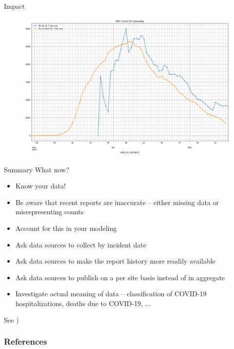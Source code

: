 \documentclass[aspectratio=169]{beamer}
\begin{document}
\begin{frame}{Impact}
  \begin{figure}
    \centering
    \includegraphics[height=.8\textheight]{../Notebooks/casesPerDayHistoryRptDtVsInDt.png}
  \end{figure}
\end{frame}

\begin{frame}{Summary}
  What now?
  \begin{itemize}
  \item Know your data!
  \item Be aware that recent reports are inaccurate -- either missing
    data or misrepresenting counts
  \item Account for this in your modeling
  \item Ask data sources to collect by incident date
  \item Ask data sources to make the report history more readily available
  \item Ask data sources to publish on a per site basis instead of in aggregate
  \item Investigate actual meaning of data -- classification of COVID-19
    hospitalizations, deaths due to COVID-19, ...
  \end{itemize}

  See ) 
\end{frame}

\begin{frame}[allowframebreaks]
  \frametitle{References}
  \label{refs}
  \begin{small}
  \printbibliography
  \end{small}
\vfil
\vbox{\hbox{}
}%
\end{frame}
\end{document}
